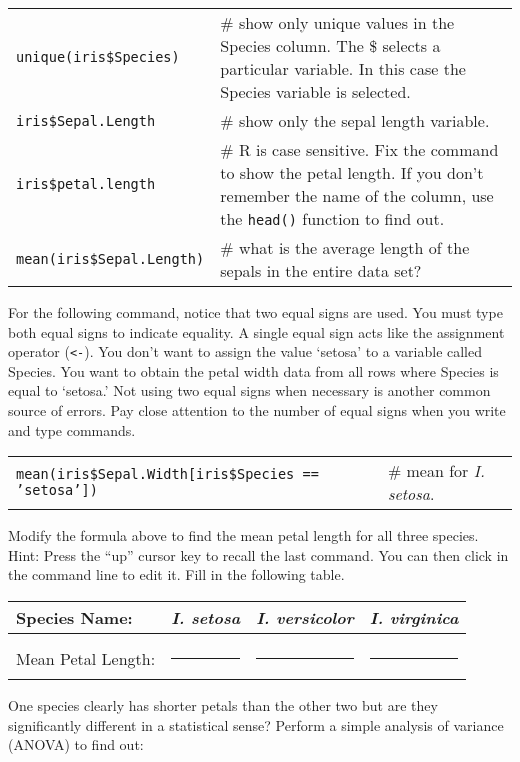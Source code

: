 \documentclass[11pt]{article}
\begin{document}
\begin{tabular}{@{}L{1.75in}L{3.75in}@{}}
\texttt{unique(iris\$Species)} & \# show only unique values in the Species column. The \$ selects a particular variable. In this case the Species variable is selected.\\

\texttt{iris\$Sepal.Length} & \# show only the sepal length variable.\\

\texttt{iris\$petal.length} & \# R is case sensitive. Fix the command to show the
petal length. If you don't remember the name of the column, use the \texttt{head()} function to find out.\\

\texttt{mean(iris\$Sepal.Length)} & \# what is the average length of the sepals in
the entire data set?\\

\end{tabular}

For the following command, notice that two equal signs are used. You must type 
both equal signs to indicate equality. A single equal sign
acts like the assignment operator (\texttt{\textless{}-}). You don't want to
assign the value `setosa' to a variable called Species. You want to
obtain the petal width data from all rows where Species is equal to
`setosa.' Not using two equal signs when necessary is another common
source of errors. Pay close attention to the number of equal signs when
you write and type commands. 

\begin{tabular}{@{}L{4in}L{2in}@{}}
\texttt{mean(iris\$Sepal.Width{[}iris\$Species == 'setosa'{]})} & \# mean for
\emph{I. setosa}. 
\end{tabular}

Modify the formula above to  find the mean petal length for all three species. Hint: Press the ``up'' cursor key to recall the last command. You can then click in the command line to edit it. Fill in the following table.


\begin{longtable}[l]{@{}lccc@{}}
\toprule
Species Name: & \emph{I. setosa} & \emph{I. versicolor} & \emph{I.
virginica}\tabularnewline
\midrule
&&&\tabularnewline[1ex]
Mean Petal Length: & \rule{1in}{0.4pt} & \rule{1in}{0.4pt}  & \rule{1in}{0.4pt} \tabularnewline
\bottomrule
\end{longtable}

One species clearly has shorter petals than the other two but are they
significantly different in a statistical sense? Perform a simple
analysis of variance (ANOVA) to find out:
\end{document}
